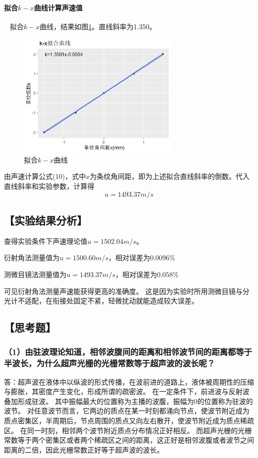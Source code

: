 \documentclass[12pt,a4paper,UTF8]{ctexart}
\begin{document}
\paragraph{拟合$k-x$曲线计算声速值}~
		\newline
		\indent
		拟合$k-x$曲线，结果如图\ref{fig:2}。直线斜率为1.350。
		\begin{figure}[htbp]
			\centering
			\includegraphics[width=0.7\textwidth]{img/curve2.jpeg}
			\caption{拟合$k-x$曲线}
			\label{fig:2}
		\end{figure}
		
		由声速计算公式(10)，式中$x$为条纹角间距，即为上述拟合直线斜率的倒数。代入直线斜率和实验参数，计算得
		$$
		u = 1493.37 m/s
		$$

\subsection*{【实验结果分析】}
查得实验条件下声速理论值$u = 1502.04 m/s$。

衍射角法测量值为$u = 1500.60 m/s$，相对误差为$0.0096\%$

测微目镜法测量值为$u = 1493.37 m/s$，相对误差为$0.058\%$

可见衍射角法测量声速能获得更高的准确度。
这是因为实验时所用测微目镜与分光计不适配，在衔接处固定不紧，轻微扰动就能造成较大误差。



\subsection*{【思考题】}
\subsubsection*{（1）由驻波理论知道，相邻波腹间的距离和相邻波节间的距离都等于半波长，为什么超声光栅的光栅常数等于超声波的波长呢？}
答：超声波在液体中以纵波的形式传播，在波前进的道路上，液体被周期性的压缩与膨胀，其密度产生变化，形成所谓的疏密波。
在一定条件下，前进波与反射波叠加形成驻波。
其中振幅最大的位置称为主播的波腹，振幅为0的位置称为驻波的波节。
对任意波节而言，它两边的质点在某一时刻都涌向节点，使波节附近成为质点密集区，半周期后，节点周围的质点又向左右散开，使波节附近成为质点稀疏区。
在同一时刻，相邻两个波节附近质点分布情况正好相反。
而超声光栅的光栅常数等于两个密集区或者两个稀疏区之间的距离，这正好是相邻波腹或者波节之间距离的二倍，因此光栅常数正好等于超声波的波长。
\end{document}
